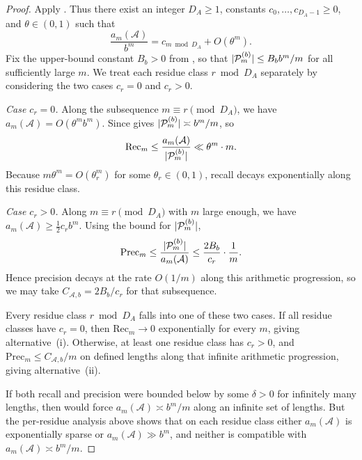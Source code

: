 \begin{proof}
  Apply . Thus there exist an integer
  \(D_A\ge 1\), constants \(c_0,\dots,c_{D_A-1}\ge 0\), and
  \(\theta\in(0,1)\) such that
  \[
    \frac{a_m(\mathcal A)}{b^m}=c_{m\bmod D_A}+O(\theta^m).
  \]
  Fix the upper-bound constant \(B_b>0\) from
  , so that
  \(\lvert \mathcal P_m^{(b)} \rvert\le B_b b^m/m\) for all sufficiently large
  \(m\).
  We treat each residue class \(r\bmod D_A\) separately by considering the
  two cases \(c_r=0\) and \(c_r>0\).

  \textit{Case \(c_r=0\).}
  Along the subsequence \(m\equiv r\pmod {D_A}\), we have
  \(a_m(\mathcal A)=O(\theta^m b^m)\). Since
   gives
  \(\lvert \mathcal P_m^{(b)} \rvert\asymp b^m/m\), so
  \[
    \mathrm{Rec}_m
    \le \frac{a_m(\mathcal A)}{\lvert \mathcal P_m^{(b)} \rvert}
    \ll \theta^m\cdot m.
  \]
  Because \(m\theta^m=O(\theta_r^m)\) for some \(\theta_r\in(0,1)\),
  recall decays exponentially along this residue class.

  \textit{Case \(c_r>0\).}
  Along \(m\equiv r\pmod {D_A}\) with \(m\) large enough, we have
  \(a_m(\mathcal A)\ge \tfrac{1}{2}c_r b^m\). Using the bound for
  \(\lvert \mathcal P_m^{(b)} \rvert\),
  \[
    \mathrm{Prec}_m
    \le \frac{\lvert \mathcal P_m^{(b)} \rvert}{a_m(\mathcal A)}
    \le \frac{2B_b}{c_r}\cdot\frac{1}{m}.
  \]
  Hence precision decays at the rate \(O(1/m)\) along this
  arithmetic progression, so we may take
  \(C_{\mathcal A,b}=2B_b/c_r\) for that subsequence.

  Every residue class \(r\bmod D_A\) falls into one of these two cases.
  If all residue classes have \(c_r=0\), then
  \(\mathrm{Rec}_m\to 0\) exponentially for every \(m\), giving
  alternative~\textup{(i)}. Otherwise, at least one residue class has
  \(c_r>0\), and \(\mathrm{Prec}_m\le C_{\mathcal A,b}/m\) on defined
  lengths along that infinite arithmetic progression, giving
  alternative~\textup{(ii)}.

  If both recall and precision were bounded below by some
  \(\delta>0\) for infinitely many lengths, then
   would force
  \(a_m(\mathcal A)\asymp b^m/m\) along an infinite set of lengths. But the
  per-residue analysis above shows that on each residue class either
  \(a_m(\mathcal A)\) is exponentially sparse or \(a_m(\mathcal A)\gg b^m\), and
  neither is compatible with \(a_m(\mathcal A)\asymp b^m/m\).
\end{proof}

